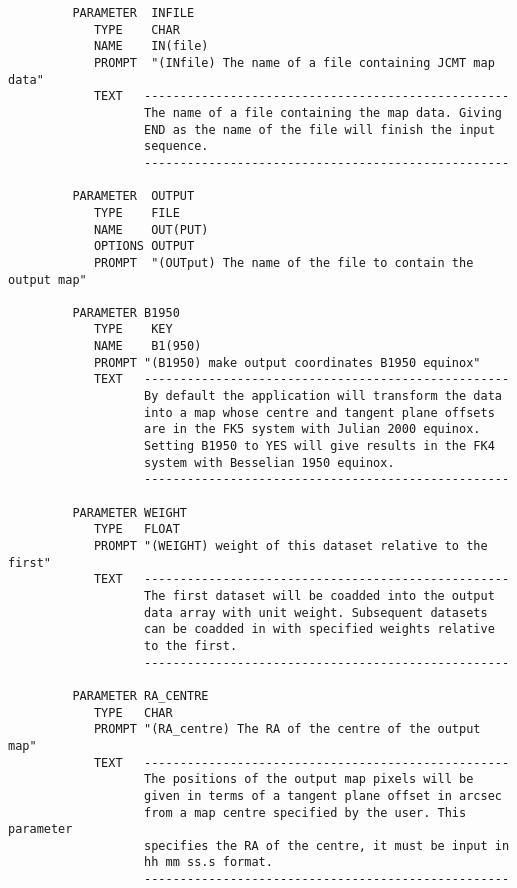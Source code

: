 \begin{small}
\begin{verbatim}
         PARAMETER  INFILE
            TYPE    CHAR
            NAME    IN(file)
            PROMPT  "(INfile) The name of a file containing JCMT map data"
            TEXT   ---------------------------------------------------
                   The name of a file containing the map data. Giving
                   END as the name of the file will finish the input 
                   sequence.
                   ---------------------------------------------------

         PARAMETER  OUTPUT
            TYPE    FILE
            NAME    OUT(PUT)
            OPTIONS OUTPUT
            PROMPT  "(OUTput) The name of the file to contain the output map"

         PARAMETER B1950 
            TYPE    KEY 
            NAME    B1(950) 
            PROMPT "(B1950) make output coordinates B1950 equinox"
            TEXT   ---------------------------------------------------
                   By default the application will transform the data 
                   into a map whose centre and tangent plane offsets
                   are in the FK5 system with Julian 2000 equinox.
                   Setting B1950 to YES will give results in the FK4
                   system with Besselian 1950 equinox.
                   ---------------------------------------------------

         PARAMETER WEIGHT
            TYPE   FLOAT
            PROMPT "(WEIGHT) weight of this dataset relative to the first"
            TEXT   ---------------------------------------------------
                   The first dataset will be coadded into the output
                   data array with unit weight. Subsequent datasets
                   can be coadded in with specified weights relative
                   to the first.
                   ---------------------------------------------------

         PARAMETER RA_CENTRE
            TYPE   CHAR
            PROMPT "(RA_centre) The RA of the centre of the output map"
            TEXT   ---------------------------------------------------
                   The positions of the output map pixels will be 
                   given in terms of a tangent plane offset in arcsec 
                   from a map centre specified by the user. This parameter
                   specifies the RA of the centre, it must be input in 
                   hh mm ss.s format.
                   ---------------------------------------------------


\end{verbatim}
\end{small}
